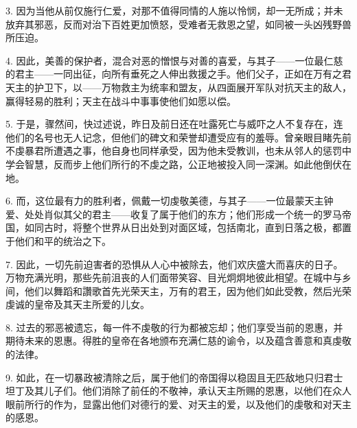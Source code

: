 3. 因为当他从前仅施行仁爱，对那不值得同情的人施以怜悯，却一无所成；并未放弃其邪恶，反而对治下百姓更加愤怒，受难者无救恩之望，如同被一头凶残野兽所压迫。\par

4. 因此，美善的保护者，混合对恶的憎恨与对善的喜爱，与其子——一位最仁慈的君主——一同出征，向所有垂死之人伸出救援之手。他们父子，正如在万有之君天主的护卫下，以——万物救主为统率和盟友，从四面展开军队对抗天主的敌人，赢得轻易的胜利；天主在战斗中事事使他们如愿以偿。\par

5. 于是，骤然间，快过述说，昨日及前日还在吐露死亡与威吓之人不复存在，连他们的名号也无人记念，但他们的碑文和荣誉却遭受应有的羞辱。曾亲眼目睹先前不虔暴君所遭遇之事，他自身也同样承受，因为他未受教训，也未从邻人的惩罚中学会智慧，反而步上他们所行的不虔之路，公正地被投入同一深渊。如此他倒伏在地。\par

6. 而，这位最有力的胜利者，佩戴一切虔敬美德，与其子——一位最蒙天主钟爱、处处肖似其父的君主——收复了属于他们的东方；他们形成一个统一的罗马帝国，如同古时，将整个世界从日出处到对面区域，包括南北，直到日落之极，都置于他们和平的统治之下。\par

7. 因此，一切先前迫害者的恐惧从人心中被除去，他们欢庆盛大而喜庆的日子。万物充满光明，那些先前沮丧的人们面带笑容、目光炯炯地彼此相望。在城中与乡间，他们以舞蹈和讚歌首先光荣天主，万有的君王，因为他们如此受教，然后光荣虔诚的皇帝及其天主所爱的儿女。\par

8. 过去的邪恶被遗忘，每一件不虔敬的行为都被忘却；他们享受当前的恩惠，并期待未来的恩惠。得胜的皇帝在各地颁布充满仁慈的谕令，以及蕴含善意和真虔敬的法律。\par

9. 如此，在一切暴政被清除之后，属于他们的帝国得以稳固且无匹敌地只归君士坦丁及其儿子们。他们消除了前任的不敬神，承认天主所赐的恩惠，以他们在众人眼前所行的作为，显露出他们对德行的爱、对天主的爱，以及他们的虔敬和对天主的感恩。\par

\par


